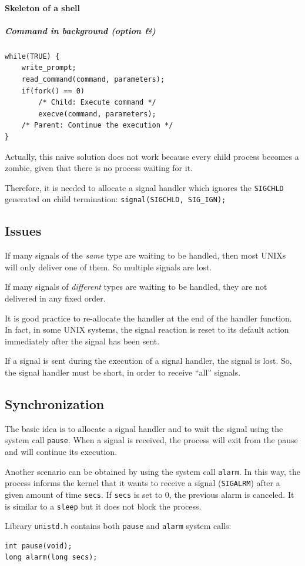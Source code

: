 \paragraph{Skeleton of a shell}
\subparagraph{Command in background (option \&)}
\begin{verbatim}
while(TRUE) {
    write_prompt;
    read_command(command, parameters);
    if(fork() == 0)
        /* Child: Execute command */
        execve(command, parameters);
    /* Parent: Continue the execution */
}
\end{verbatim}
Actually, this naive solution does not work because every child process becomes a zombie, given that there is no process waiting for it.

Therefore, it is needed to allocate a signal handler which ignores the \texttt{SIGCHLD} generated on child termination: \texttt{signal(SIGCHLD, SIG\_IGN);}

\subsection{Issues}
If many signals of the \emph{same} type are waiting to be handled, then most UNIXs will only deliver one of them. So multiple signals are lost.

If many signals of \emph{different} types are waiting to be handled, they are not delivered in any fixed order.

It is good practice to re-allocate the handler at the end of the handler function. In fact, in some UNIX systems, the signal reaction is reset to its default action immediately after the signal has been sent.

If a signal is sent during the execution of a signal handler, the signal is lost. So, the signal handler must be short, in order to receive
``all'' signals.

\subsection{Synchronization}
The basic idea is to allocate a signal handler and to wait the signal using the system call \texttt{pause}. When a signal is received, the process will exit from the pause and will continue its execution.

Another scenario can be obtained by using the system call \texttt{alarm}. In this way, the process informs the kernel that it wants to receive a signal (\texttt{SIGALRM}) after a given amount of time \texttt{secs}. If \texttt{secs} is set to 0, the previous alarm is canceled.
It is similar to a \texttt{sleep} but it does not block the process.

Library \texttt{unistd.h} contains both \texttt{pause} and \texttt{alarm} system calls:
\begin{verbatim}
int pause(void);
long alarm(long secs);
\end{verbatim}